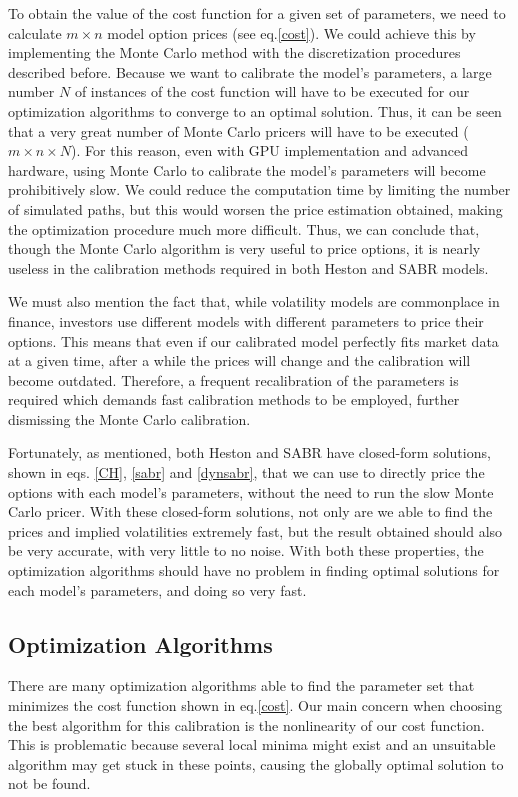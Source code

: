 To obtain the value of the cost function for a given set of parameters, we need to calculate $m\times n$ model option prices (see eq.\eqref{cost}). We could achieve this by implementing the Monte Carlo method with the discretization procedures described before.
Because we want to calibrate the model's parameters, a large number $N$ of instances of the cost function will have to be executed for our optimization algorithms to converge to an optimal solution.
Thus, it can be seen that a very great number of Monte Carlo pricers will have to be executed ($m\times n\times N$). For this reason, even with GPU implementation and advanced hardware, using Monte Carlo to calibrate the model's parameters will become prohibitively slow. We could reduce the computation time by limiting the number of simulated paths, but this would worsen the price estimation obtained, making the optimization procedure much more difficult.
Thus, we can conclude that, though the Monte Carlo algorithm is very useful to price options, it is nearly useless in the calibration methods required in both Heston and SABR models.


We must also mention the fact that, while volatility models are commonplace in finance, investors use different models with different parameters to price their options. This means that even if our calibrated model perfectly fits market data at a given time, after a while the prices will change and the calibration will become outdated. Therefore, a frequent recalibration of the parameters is required which demands fast calibration methods to be employed, further dismissing the Monte Carlo calibration.


Fortunately, as mentioned, both Heston and SABR have closed-form solutions, shown in eqs. \eqref{CH}, \eqref{sabr} and \eqref{dynsabr}, that we can use to directly price the options with each model's parameters, without the need to run the slow Monte Carlo pricer. With these closed-form solutions, not only are we able to find the prices and implied volatilities extremely fast, but the result obtained should also be very accurate, with very little to no noise. With both these properties, the optimization algorithms should have no problem in finding optimal solutions for each model's parameters, and doing so very fast.





\subsection{Optimization Algorithms}
There are many optimization algorithms able to find the parameter set that minimizes the cost function shown in eq.\eqref{cost}.
Our main concern when choosing the best algorithm for this calibration is the nonlinearity of our cost function. This is problematic because several local minima might exist and an unsuitable algorithm may get stuck in these points, causing the globally optimal solution to not be found.

